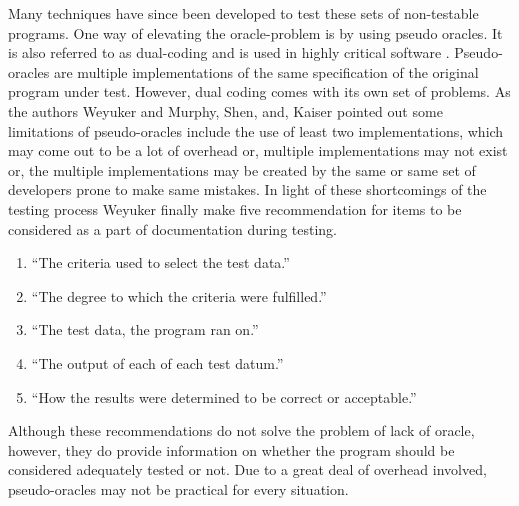  Many techniques have since been developed to test these sets of non-testable programs. One way of elevating the oracle-problem is by using pseudo oracles. It is also referred to as dual-coding and is used in highly critical software \cite{Weyuker,Murphy2009}. Pseudo-oracles are multiple implementations of the same specification of the original program under test.
 However, dual coding comes with its own set of problems. As the authors Weyuker \cite{Weyuker} and Murphy, Shen, and, Kaiser \cite{Murphy2009} pointed out some limitations of pseudo-oracles include the use of least two implementations, which may come out to be a lot of overhead or, multiple implementations may not exist or, the multiple implementations may be created by the same or same set of developers prone to make same mistakes.
 In light of these shortcomings of the testing process Weyuker \cite{Weyuker} finally make five recommendation for items to be considered as a part of documentation during testing.
\begin{enumerate}
  \item \enquote{The criteria used to select the test data.}
  \item \enquote{The degree to which the criteria were fulfilled.}
  \item \enquote{The test data, the program ran on.}
  \item \enquote{The output of each of each test datum.}
  \item \enquote{How the results were determined to be correct or acceptable.}
\end{enumerate}
Although these recommendations do not solve the problem of lack of oracle, however, they do provide information on whether the program should be considered adequately tested or not. Due to a great deal of overhead involved, pseudo-oracles may not be practical for every situation.  

